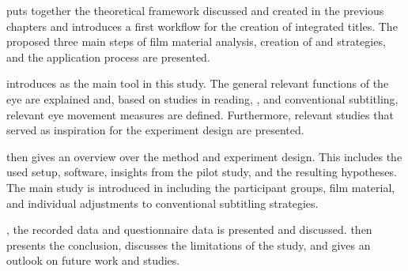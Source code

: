  puts together the theoretical framework discussed and created in the previous chapters and introduces a first workflow for the creation of integrated titles. The proposed three main steps of film material analysis, creation of  and  strategies, and the application process are presented.

 introduces  as the main tool in this study. The general relevant functions of the eye are explained and, based on  studies in reading, , and conventional subtitling, relevant eye movement measures are defined. Furthermore, relevant studies that served as inspiration for the experiment design are presented.

 then gives an overview over the method and experiment design. This includes the used  setup, software, insights from the pilot study, and the resulting hypotheses. The main study is introduced in  including the participant groups, film material, and individual adjustments to conventional subtitling strategies.

\largerpage
{}, the recorded  data and questionnaire data is presented and discussed.  then presents the conclusion, discusses the limitations of the study, and gives an outlook on future work and studies.

